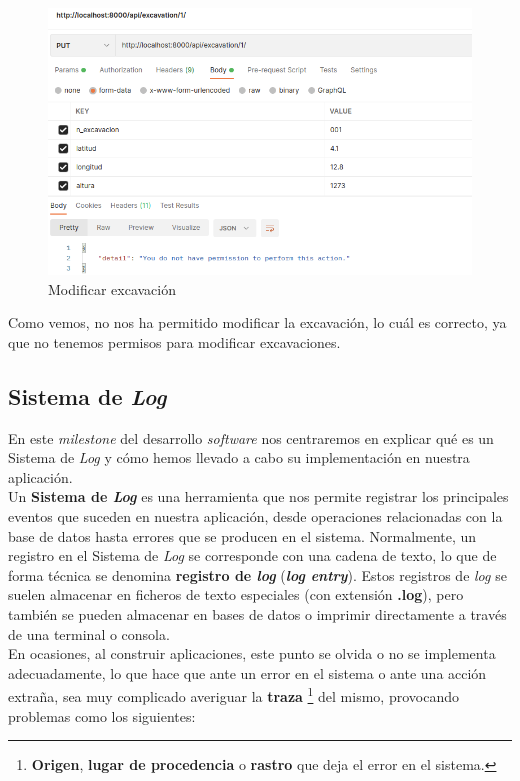         \begin{figure}[H]
            \centering
            \includegraphics[scale=0.40]{imagenes/put-excavation.png}
            \caption{Modificar excavación}
            \label{fig:put-excavation}
        \end{figure}

Como vemos, no nos ha permitido modificar la excavación, lo cuál es correcto, ya que no
tenemos permisos para modificar excavaciones.

\subsection{Sistema de \textit{Log}}
En este \textit{milestone} del desarrollo \textit{software} nos centraremos en explicar qué
es un Sistema de \textit{Log} y cómo hemos llevado a cabo su implementación en nuestra
aplicación. \\

Un \textbf{Sistema de \textit{Log}} \cite{log-system} es una herramienta que nos permite
registrar los principales eventos que suceden en nuestra aplicación, desde operaciones
relacionadas con la base de datos hasta errores que se producen en el sistema. Normalmente,
un registro en el Sistema de \textit{Log} se corresponde con una cadena de texto, lo que de
forma técnica se denomina \textbf{registro de \textit{log}} (\textbf{\textit{log entry}}).
Estos registros de \textit{log} se suelen almacenar en ficheros de texto especiales (con
extensión \textbf{.log}), pero también se pueden almacenar en bases de datos o imprimir
directamente a través de una terminal o consola.\\

En ocasiones, al construir aplicaciones, este punto se olvida o no se implementa
adecuadamente, lo que hace que ante un error en el sistema o ante una acción extraña, sea
muy complicado averiguar la \textbf{traza} \footnote{\textbf{Origen},
\textbf{lugar de procedencia} o \textbf{rastro} que deja el error en el sistema.} del
mismo, provocando problemas como los siguientes:

